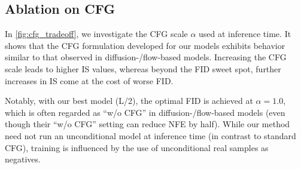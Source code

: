 \subsection{Ablation on CFG}
\label{section:exp_cfg}

In \cref{fig:cfg_tradeoff}, we investigate the CFG scale $\alpha$ used at inference time.
It shows that the CFG formulation developed for our models exhibits behavior similar to that observed in diffusion-/flow-based models.
Increasing the CFG scale leads to higher IS values, whereas beyond the FID sweet spot, further increases in IS come at the cost of worse FID.

Notably, with our best model (L/2), the optimal FID is achieved at $\alpha{=}1.0$, which is often regarded as ``w/o CFG'' in diffusion-/flow-based models (even though their ``w/o CFG'' setting can reduce NFE by half). 
While our method need not run an unconditional model at inference time (in contrast to standard CFG), training is influenced by the use of unconditional real samples as negatives.

